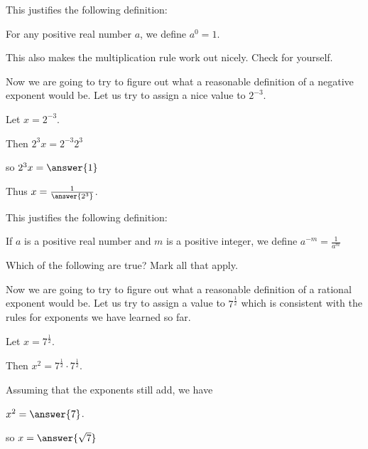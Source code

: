\documentclass{ximera}
\begin{document}
This justifies the following definition:

\begin{definition}
For any positive real number $a$, we define $a^0 = 1$.
\end{definition}

This also makes the multiplication rule work out nicely.  Check for yourself.

\begin{question}
	Now we are going to try to figure out what a reasonable definition of a negative exponent would be.   Let us try to assign a nice value to $2^{-3}$. 
	
	Let $x = 2^{-3}$.

	Then $2^3 x = 2^{-3} 2^3$
	
	so $2^3 x = \answer{1}$
	
	Thus $x = \frac{1}{\answer{2^3}}$.
\end{question}

This justifies the following definition:

\begin{definition}
	If $a$ is a positive real number and $m$ is a positive integer, we define $a^{-m} = \frac{1}{a^m}$
\end{definition}

\begin{question}
	Which of the following are true?  Mark all that apply.
	\begin{selectAll}
	\end{selectAll}
\end{question}

\begin{question}
Now we are going to try to figure out what a reasonable definition of a rational exponent would be.  Let us try to assign a value to $7^\frac{1}{2}$ which is consistent with the rules for exponents we have learned so far.

Let $x = 7^\frac{1}{2}$.

Then $x^2 = 7^\frac{1}{2} \cdot 7^\frac{1}{2}$.

Assuming that the exponents still add, we have

$x^2 =  \answer{7}$.

so $x = \answer{\sqrt{7}}$
\end{question}
\end{document}

